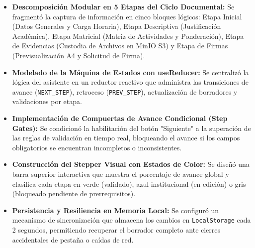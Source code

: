 \documentclass[12pt,a4paper]{article}
\begin{document}
\begin{itemize}[leftmargin=1.5em, itemsep=4pt]
    \item \textbf{Descomposición Modular en 5 Etapas del Ciclo Documental:} Se fragmentó la captura de información en cinco bloques lógicos: Etapa Inicial (Datos Generales y Carga Horaria), Etapa Descriptiva (Justificación Académica), Etapa Matricial (Matriz de Actividades y Ponderación), Etapa de Evidencias (Custodia de Archivos en MinIO S3) y Etapa de Firmas (Previsualización A4 y Solicitud de Firma).
    \item \textbf{Modelado de la Máquina de Estados con useReducer:} Se centralizó la lógica del asistente en un reductor reactivo que administra las transiciones de avance (\texttt{NEXT\_\allowbreak  STEP}), retroceso (\texttt{PREV\_\allowbreak  STEP}), actualización de borradores y validaciones por etapa.
    \item \textbf{Implementación de Compuertas de Avance Condicional (Step Gates):} Se condicionó la habilitación del botón "Siguiente" a la superación de las reglas de validación en tiempo real, bloqueando el avance si los campos obligatorios se encuentran incompletos o inconsistentes.
    \item \textbf{Construcción del Stepper Visual con Estados de Color:} Se diseñó una barra superior interactiva que muestra el porcentaje de avance global y clasifica cada etapa en verde (validado), azul institucional (en edición) o gris (bloqueado pendiente de prerrequisitos).
    \item \textbf{Persistencia y Resiliencia en Memoria Local:} Se configuró un mecanismo de sincronización que almacena los cambios en \texttt{LocalStorage} cada 2 segundos, permitiendo recuperar el borrador completo ante cierres accidentales de pestaña o caídas de red.
\end{itemize}
\end{document}
